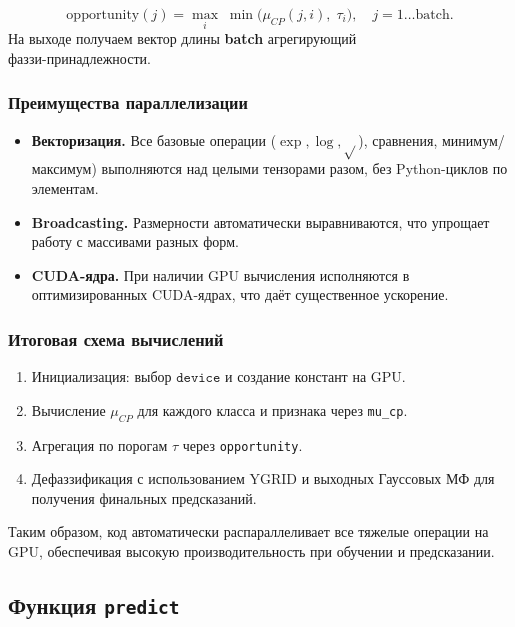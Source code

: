\begin{definition}
\[
  \mathrm{opportunity}(j) 
  = \max_{i}\;\min\bigl(\mu_{CP}(j,i),\;\tau_i\bigr),
  \quad j=1\ldots\text{batch}.
\]
На выходе получаем вектор длины \textbf{batch} агрегирующий \\ фаззи-принадлежности.
\end{definition}

\subsubsection{Преимущества параллелизации}

\begin{itemize}
  \item \textbf{Векторизация.} Все базовые операции ($\exp, \log, \sqrt{}$), сравнения, минимум/максимум) выполняются над целыми тензорами разом, без Python-циклов по элементам.
  \item \textbf{Broadcasting.} Размерности автоматически выравниваются, что упрощает работу с массивами разных форм.
  \item \textbf{CUDA-ядра.} При наличии GPU вычисления исполняются в оптимизированных CUDA-ядрах, что даёт существенное ускорение.
\end{itemize}

\subsubsection{Итоговая схема вычислений}

\begin{enumerate}
  \item Инициализация: выбор \(\texttt{device}\) и создание констант на GPU.
  \item Вычисление \(\mu_{CP}\) для каждого класса и признака через \verb|mu_cp|.
  \item Агрегация по порогам \(\tau\) через \verb|opportunity|.
  \item Дефаззификация с использованием \(\mathrm{YGRID}\) и выходных Гауссовых МФ для получения финальных предсказаний.
\end{enumerate}

Таким образом, код автоматически распараллеливает все тяжелые операции на GPU, обеспечивая высокую производительность при обучении и предсказании.


\subsection{Функция \texttt{predict}}

